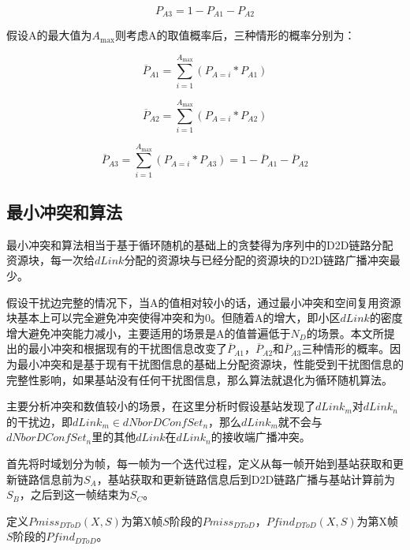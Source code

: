 \documentclass[figurelist,tablelist,algorithmlist,nomlist,masters]{seuthesix}
\begin{document}
	\begin{equation}\label{eq3.1}
	P_{A3} = 1 - P_{A1} - P_{A2}
	\end{equation}

	假设A的最大值为${A_{\max }}$则考虑A的取值概率后，三种情形的概率分别为：

	\begin{equation}\label{eq3.1}
	{\overline P_{A1}} = \sum\limits_{i = 1}^{{A_{\max }}} {({P_{A = i}}*P_{A1})}
	\end{equation}

	\begin{equation}\label{eq3.1}
	{\overline P_{A2}} = \sum\limits_{i = 1}^{{A_{\max }}} {({P_{A = i}}*{P_{A2}})}
	\end{equation}

	\begin{equation}\label{eq3.1}
	{\overline P_{A3}} = \sum\limits_{i = 1}^{{A_{\max }}} {({P_{A = i}}*{P_{A3}}) = } 1 - {\overline P_{A1}} - {\overline P_{A2}}
	\end{equation}

	\subsection{最小冲突和算法}
	最小冲突和算法相当于基于循环随机的基础上的贪婪得为序列中的D2D链路分配资源块，每一次给$dLink$分配的资源块与已经分配的资源块的D2D链路广播冲突最少。

	假设干扰边完整的情况下，当A的值相对较小的话，通过最小冲突和空间复用资源块基本上可以完全避免冲突使得冲突和为0。但随着A的增大，即小区$dLink$的密度增大避免冲突能力减小，主要适用的场景是A的值普遍低于$N_D$的场景。本文所提出的最小冲突和根据现有的干扰图信息改变了${\overline P_{A1}}$，${\overline P_{A2}}$和${\overline P_{A3}}$三种情形的概率。因为最小冲突和是基于现有干扰图信息的基础上分配资源块，性能受到干扰图信息的完整性影响，如果基站没有任何干扰图信息，那么算法就退化为循环随机算法。

	主要分析冲突和数值较小的场景，在这里分析时假设基站发现了$dLink_m$对$dLink_n$的干扰边，即$dLink_m \in dNborDConfSe{t_n}$，那么$dLink_m$就不会与$dNborDConfSe{t_n}$里的其他$dLink$在$dLink_n$的接收端广播冲突。

	首先将时域划分为帧，每一帧为一个迭代过程，定义从每一帧开始到基站获取和更新链路信息前为$S{_A}$，基站获取和更新链路信息后到D2D链路广播与基站计算前为$S{_B}$，之后到这一帧结束为$S{_C}$。

	定义$Pmis{s_{DToD}}(X,S)$为第X帧$S$阶段的$Pmis{s_{DToD}}$，$Pfin{d_{DToD}}(X,S)$为第X帧$S$阶段的$Pfin{d_{DToD}}$。
\end{document}
